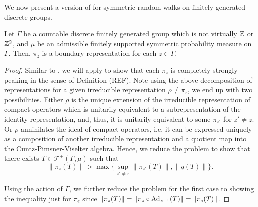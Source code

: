 \documentclass[12pt, class = article, crop = false, a4paper, twoside]{standalone}
\begin{document}
We now present a version of \cite[Proposition 3.11]{DOMA17} for symmetric random walks on finitely generated discrete groups.
\begin{proposition}

    Let $\Gamma$ be a countable discrete finitely generated group which is not virtually $\mathbb{Z}$ or $\mathbb{Z}^{2}$, and $\mu$ be an admissible finitely supported symmetric probability measure on $\Gamma$. Then, $\pi_{z}$ is a boundary representation for each $z\in\Gamma$.
\end{proposition}

\begin{proof}

    Similar to \cite[Proposition 3.11]{DOMA17}, we will apply \cite[Theorem 7.2]{ARWI11} to show that each $\pi_{z}$ is completely strongly peaking in the sense of Definition (REF). Note using the above decomposition of representations for a given irreducible representation $\rho\neq\pi_{z}$, we end up with two possibilities. Either $\rho$ is the unique extension of the irreducible representation of compact operators which is unitarily equivalent to a subrepresentation of the identity representation, and, thus, it is unitarily equivalent to some $\pi_{z'}$ for $z'\neq z$. Or $\rho$ annihilates the ideal of compact operators, i.e. it can be expressed uniquely as a composition of another irreducible representation and a quotient map into the Cuntz-Pimsner-Viselter algebra. Hence, we reduce the problem to show that there exists $T\in \mathcal{T^{+}}(\Gamma, \mu)$ such that
    \begin{equation*}
        \|\pi_{z}(T)\| > \max\{\sup_{z'\neq z}\|\pi_{z'}(T)\|, \|q(T)\|\}.
    \end{equation*}

    Using the action of $\Gamma$, we further reduce the problem for the first case to showing the inequality just for $\pi_{e}$ since $\|\pi_{z}(T)\| = \|\pi_{z}\circ\operatorname{Ad}_{z^{-1}}(T)\| = \|\pi_{e}(T)\|$.


\end{proof}
\end{document}
